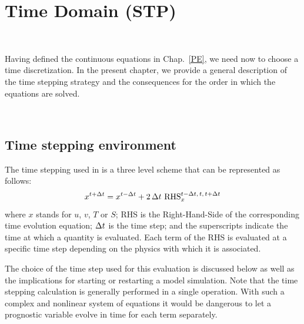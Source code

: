 
\chapter{Time Domain (STP) }
\label{STP}
\minitoc





\newpage
$\ $\newline    %


Having defined the continuous equations in Chap.~\ref{PE}, we need now to choose 
a time discretization. In the present chapter, we provide a general description of the \NEMO 
time stepping strategy and the consequences for the order in which the equations are
solved.

$\ $\newline    %
\section{Time stepping environment}
\label{STP_environment}

The time stepping used in \NEMO is a three level scheme that can be 
represented as follows:
\begin{equation} \label{Eq_STP}
   x^{t+\Delta t} = x^{t-\Delta t} + 2 \, \Delta t \  \text{RHS}_x^{t-\Delta t,\,t,\,t+\Delta t}
\end{equation} 
where $x$ stands for $u$, $v$, $T$ or $S$; RHS is the Right-Hand-Side of the 
corresponding time evolution equation; $\Delta t$ is the time step; and the 
superscripts indicate the time at which a quantity is evaluated. Each term of the 
RHS is evaluated at a specific time step depending on the physics with which 
it is associated. 

The choice of the time step used for this evaluation is discussed below as 
well as the implications for starting or restarting a model 
simulation. Note that the time stepping calculation is generally performed in a single 
operation. With such a complex and nonlinear system of equations it would be 
dangerous to let a prognostic variable evolve in time for each term separately.

